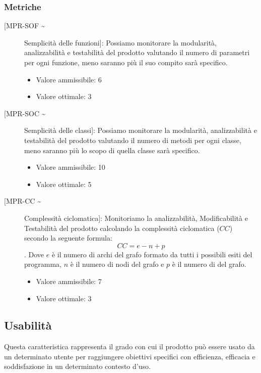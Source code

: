 \documentclass[../piano-di-qualifica.tex]{subfiles}
\begin{document}
\subsubsection{Metriche}%
\label{subs:metriche_manutenibilita}
  \begin{description}
    \item [[MPR-SOF \textasciitilde] Semplicità delle funzioni]: Possiamo monitorare la modularità, analizzabilità e testabilità del prodotto valutando il numero di parametri per ogni funzione, meno saranno più il suo compito sarà specifico.
      \begin{itemize}   \item Valore ammissibile: \leq{}  6 \item Valore ottimale: \leq{}  3 \end{itemize}
    \item [[MPR-SOC \textasciitilde] Semplicità delle classi]: Possiamo monitorare la modularità, analizzabilità e testabilità del prodotto valutando il numero di metodi per ogni classe, meno saranno più lo scopo di quella classe sarà specifico.
      \begin{itemize} \item Valore ammissibile: \leq{}  10 \item Valore ottimale: \leq{}  5 \end{itemize}
    \item [[MPR-CC \textasciitilde] Complessità ciclomatica]: Monitoriamo la analizzabilità, Modificabilità e Testabilità del prodotto calcolando la complessità ciclomatica (\(CC\)) secondo la seguente formula: \begin{equation} CC = e - n + p \end{equation}. Dove \(e\) è il numero di archi del grafo formato da tutti i possibili esiti del programma, \(n\) è il numero di nodi del grafo e \(p\) è il numero di  del grafo.
      \begin{itemize} \item Valore ammissibile: \leq{}  7 \item Valore ottimale: \leq{}  3 \end{itemize}
  \end{description}


\subsection{Usabilità}%
\label{sub:usabilita}
Questa caratteristica rappresenta il grado con cui il prodotto può essere usato da un determinato utente per raggiungere obiettivi specifici con efficienza, efficacia e soddisfazione in un determinato contesto d'uso.
\end{document}
